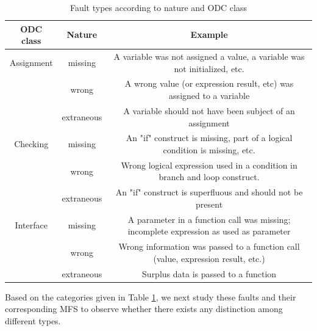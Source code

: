\documentclass{sig-alternate-05-2015}
\begin{document}
\begin{table}[ht]
  \centering
  \caption{Fault types according to nature and ODC class}
    \begin{tabular}{|c|c|c|}  \hline
    ODC class & Nature & Example \\ \hline
    Assignment & missing & A variable was not assigned a value, a variable was not initialized, etc. \\
          & wrong & A wrong value (or expression result, etc) was assigned to a variable \\
          & extraneous & A variable should not have been subject of an assignment \\  \hline
    Checking & missing & An "if" construct is missing, part of a logical condition is missing, etc. \\
          & wrong & Wrong logical expression used in a condition in branch and loop construct. \\
          & extraneous & An "if" construct is superfluous and should not be present \\  \hline
    Interface & missing & A parameter in a function call was missing; incomplete expression as used as parameter \\
          & wrong & Wrong information was passed to a function call (value, expression result, etc.) \\
          & extraneous & Surplus data is passed to a function \\  \hline
    \end{tabular}%
  \label{tab_fault typles}%
\end{table}%

Based on the categories given in Table \ref{tab_fault typles}, we next study these faults and their corresponding MFS to observe whether there exists any distinction among different types.
\end{document}
